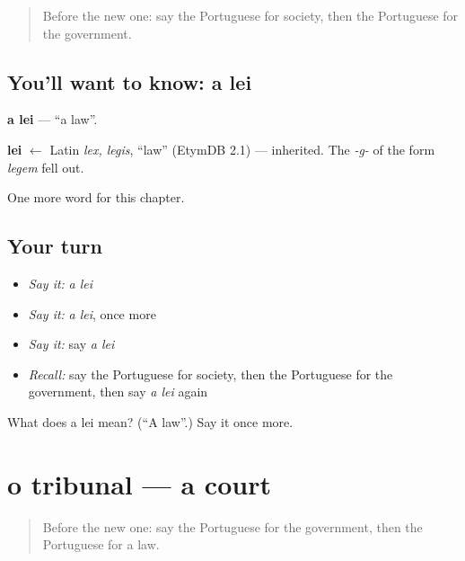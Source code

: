 \label{lesson:PT-C158-lei}



\begin{quote}
Before the new one: say the Portuguese for society, then the Portuguese for the government.
\end{quote}

\subsection*{You'll want to know: a lei}
\textbf{a lei} — \textquotedblleft{}a law\textquotedblright{}.

\begin{cousinweb}
\textbf{lei} $\leftarrow$ Latin \emph{lex, legis}, \textquotedblleft{}law\textquotedblright{} (EtymDB 2.1) — inherited. The \emph{-g-} of the form \emph{legem} fell out.
\end{cousinweb}

\begin{grammarlens}[title={What you've built}]
One more word for this chapter.
\end{grammarlens}

\subsection*{Your turn}
\begin{itemize}
\raggedright
  \item \emph{Say it:} \emph{a lei}
  \item \emph{Say it:} \emph{a lei}, once more
  \item \emph{Say it:} say \emph{a lei}
  \item \emph{Recall:} say the Portuguese for society, then the Portuguese for the government, then say \emph{a lei} again
\end{itemize}

\begin{tcolorbox}[breakable,colback=teal!4,colframe=teal!35!black,title={Before you move on}]
What does a lei mean? (\textquotedblleft{}A law\textquotedblright{}.) Say it once more.
\end{tcolorbox}
\section[o tribunal]{o tribunal — a court}

\label{lesson:PT-C158-tribunal}



\begin{quote}
Before the new one: say the Portuguese for the government, then the Portuguese for a law.
\end{quote}

